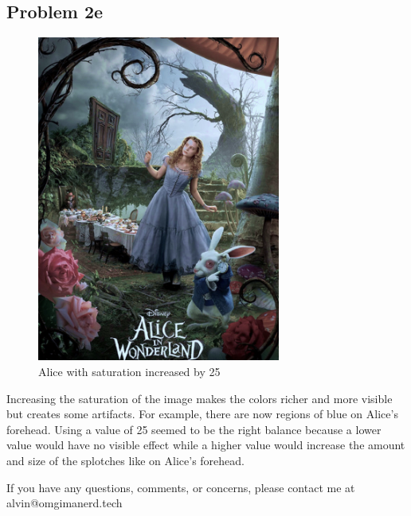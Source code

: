 \documentclass{math}
\begin{document}
\subsection*{Problem 2e}
\begin{figure}[H]
  \centering
  \includegraphics[width=8cm]{assets/hw_01_alice_saturated.png}
  \caption{Alice with saturation increased by 25}
\end{figure}
Increasing the saturation of the image makes the colors richer and more visible
but creates some artifacts. For example, there are now regions of blue on
Alice's forehead. Using a value of 25 seemed to be the right balance because a
lower value would have no visible effect while a higher value would increase the
amount and size of the splotches like on Alice's forehead.

\begin{center}
  If you have any questions, comments, or concerns, please contact me at
  alvin@omgimanerd.tech
\end{center}
\end{document}
